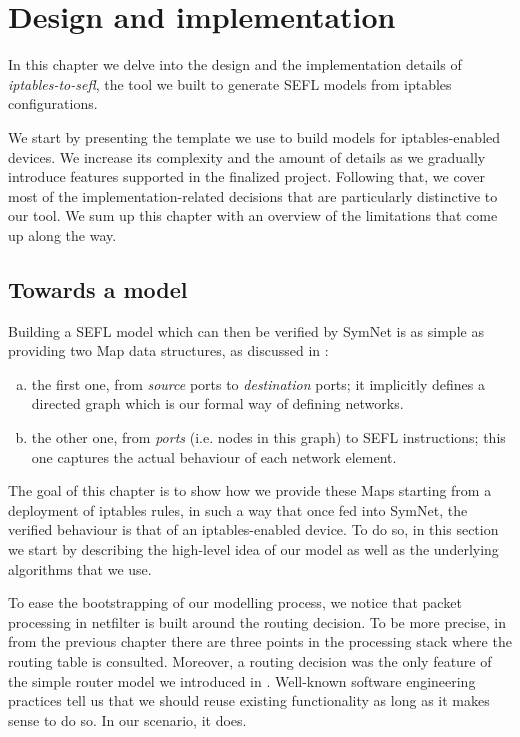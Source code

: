 \chapter{Design and implementation}\label{chapter:design}

In this chapter we delve into the design and the implementation details of
\emph{iptables-to-sefl}, the tool we built to generate SEFL models from
iptables configurations.

We start by presenting the template we use to build models for iptables-enabled
devices.  We increase its complexity and the amount of details as we gradually
introduce features supported in the finalized project.  Following that, we
cover most of the implementation-related decisions that are particularly
distinctive to our tool.  We sum up this chapter with an overview of the
limitations that come up along the way.


\section{Towards a model}

Building a SEFL model which can then be verified by SymNet is as simple as
providing two Map data structures, as discussed in
:
\begin{enumerate}[a)]
  \item the first one, from \emph{source} ports to \emph{destination} ports; it
    implicitly defines a directed graph which is our formal way of defining
    networks.
  \item the other one, from \emph{ports} (i.e. nodes in this graph) to SEFL
    instructions; this one captures the actual behaviour of each network
    element.
\end{enumerate}

The goal of this chapter is to show how we provide these Maps starting from a
deployment of iptables rules, in such a way that once fed into SymNet, the
verified behaviour is that of an iptables-enabled device.  To do so, in this
section we start by describing the high-level idea of our model as well as the
underlying algorithms that we use.

\bigskip

To ease the bootstrapping of our modelling process, we notice that packet
processing in netfilter is built around the routing decision.  To be more
precise, in  from the previous
chapter there are three points in the processing stack where the routing table
is consulted.  Moreover, a routing decision was the only feature of the simple
router model we introduced in .
Well-known software engineering practices tell us that we should reuse existing
functionality as long as it makes sense to do so.  In our scenario, it does.


